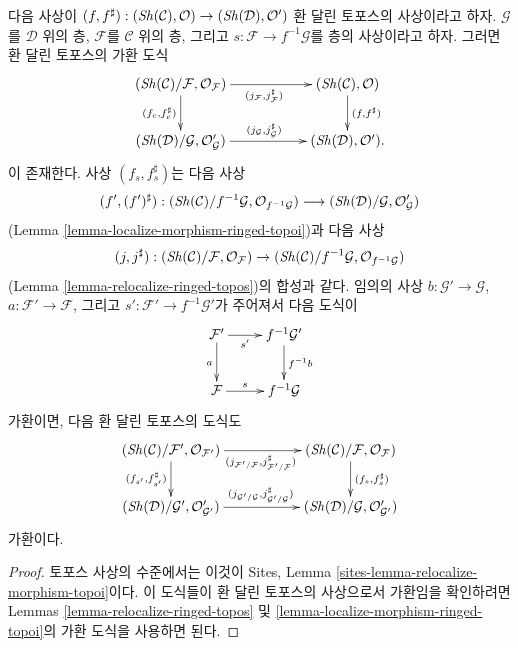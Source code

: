 \begin{lemma}
\label{lemma-relocalize-morphism-ringed-topoi}
다음 사상이
$(f, f^\sharp) :
(\mathop{\mathit{Sh}}\nolimits(\mathcal{C}), \mathcal{O})
\to
(\mathop{\mathit{Sh}}\nolimits(\mathcal{D}), \mathcal{O}')$
환 달린 토포스의 사상이라고 하자. $\mathcal{G}$를 $\mathcal{D}$ 위의 층,
$\mathcal{F}$를 $\mathcal{C}$ 위의 층, 그리고
$s : \mathcal{F} \to f^{-1}\mathcal{G}$를 층의 사상이라고 하자.
그러면 환 달린 토포스의 가환 도식
$$
\xymatrix{
(\Sh(\mathcal{C})/\mathcal{F}, \mathcal{O}_\mathcal{F})
\ar[rr]_{(j_\mathcal{F}, j_\mathcal{F}^\sharp)}
\ar[d]_{(f_c, f_c^\sharp)} & &
(\Sh(\mathcal{C}), \mathcal{O})
\ar[d]^{(f, f^\sharp)} \\
(\Sh(\mathcal{D})/\mathcal{G}, \mathcal{O}'_\mathcal{G})
\ar[rr]^{(j_\mathcal{G}, j_\mathcal{G}^\sharp)} & &
(\Sh(\mathcal{D}), \mathcal{O}').
}
$$
이 존재한다. 사상 $(f_s, f_s^\sharp)$는 다음 사상
$$
(f', (f')^\sharp) :
(\mathop{\mathit{Sh}}\nolimits(\mathcal{C})/f^{-1}\mathcal{G}, \mathcal{O}_{f^{-1}\mathcal{G}})
\longrightarrow
(\mathop{\mathit{Sh}}\nolimits(\mathcal{D})/{\mathcal{G}}, \mathcal{O}'_\mathcal{G})
$$
(Lemma \ref{lemma-localize-morphism-ringed-topoi})과 다음 사상
$$
(j, j^\sharp) :
(\mathop{\mathit{Sh}}\nolimits(\mathcal{C})/\mathcal{F}, \mathcal{O}_\mathcal{F})
\to
(\mathop{\mathit{Sh}}\nolimits(\mathcal{C})/f^{-1}\mathcal{G}, \mathcal{O}_{f^{-1}\mathcal{G}})
$$
(Lemma \ref{lemma-relocalize-ringed-topos})의 합성과 같다.
임의의 사상 $b : \mathcal{G}' \to \mathcal{G}$,
$a : \mathcal{F}' \to \mathcal{F}$, 그리고
$s' : \mathcal{F}' \to f^{-1}\mathcal{G}'$가 주어져서 다음 도식이
$$
\xymatrix{
\mathcal{F}' \ar[r]_-{s'} \ar[d]_a &
f^{-1}\mathcal{G}' \ar[d]^{f^{-1}b} \\
\mathcal{F} \ar[r]^-s &
f^{-1}\mathcal{G}
}
$$
가환이면, 다음 환 달린 토포스의 도식도
$$
\xymatrix{
(\Sh(\mathcal{C})/\mathcal{F}', \mathcal{O}_{\mathcal{F}'})
\ar[rr]_{(j_{\mathcal{F}'/\mathcal{F}}, j_{\mathcal{F}'/\mathcal{F}}^\sharp)}
\ar[d]_{(f_{s'}, f_{s'}^\sharp)} & &
(\Sh(\mathcal{C})/\mathcal{F}, \mathcal{O}_\mathcal{F})
\ar[d]^{(f_s, f_s^\sharp)} \\
(\Sh(\mathcal{D})/\mathcal{G}', \mathcal{O}'_{\mathcal{G}'})
\ar[rr]^{(j_{\mathcal{G}'/\mathcal{G}}, j_{\mathcal{G}'/\mathcal{G}}^\sharp)}
& &
(\Sh(\mathcal{D})/\mathcal{G}, \mathcal{O}'_{\mathcal{G}'})
}
$$
가환이다.
\end{lemma}

\begin{proof}
토포스 사상의 수준에서는 이것이 Sites, Lemma
\ref{sites-lemma-relocalize-morphism-topoi}이다. 이 도식들이 환 달린 토포스의
사상으로서 가환임을 확인하려면 Lemmas
\ref{lemma-relocalize-ringed-topos} 및
\ref{lemma-localize-morphism-ringed-topoi}의 가환 도식을 사용하면 된다.
\end{proof}

